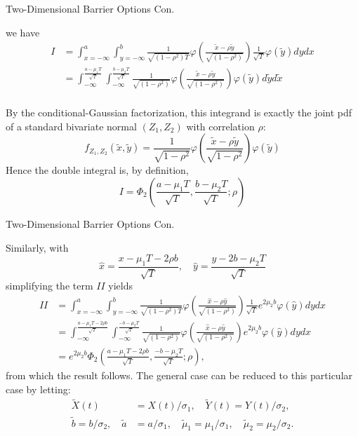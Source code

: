 \documentclass{beamer}
\begin{document}
\begin{frame}{Two-Dimensional Barrier Options Con.}

    {\footnotesize \footnotesize
    \par  we have
    \begin{align*}
    I &= \int_{x=-\infty}^a \int_{y=-\infty}^b \frac{1}{\sqrt{(1-\rho^2)T}} \varphi \left( \frac{\tilde{x}-\rho\tilde{y}}{\sqrt{(1-\rho^2)}} \right)
     \frac{1}{\sqrt{T}} \varphi (\tilde{y}) dy dx \\
    &= \int_{-\infty}^{\frac{a-\mu_1 T}{\sqrt{T}}} \int_{-\infty}^{\frac{b-\mu_2 T}{\sqrt{T}}} \frac{1}{\sqrt{(1-\rho^2)}} 
    \varphi \left( \frac{\tilde{x}-\rho\tilde{y}}{\sqrt{(1-\rho^2)}} \right) \varphi (\tilde{y}) d\tilde{y} d\tilde{x}\\
    \end{align*}
    \par By the conditional-Gaussian factorization, this integrand is exactly the joint pdf of a standard bivariate normal \((Z_1, Z_2)\) with correlation \(\rho\):
\[
f_{Z_1, Z_2} (\tilde{x}, \tilde{y}) = \frac{1}{\sqrt{1 - \rho^2}} \varphi \left( \frac{\tilde{x} - \rho \tilde{y}}{\sqrt{1 - \rho^2}} \right) \varphi (\tilde{y})
\]
Hence the double integral is, by definition,
\[
I = \Phi_2 \left( \frac{a - \mu_1 T}{\sqrt{T}}, \frac{b - \mu_2 T}{\sqrt{T}}; \rho \right)
\]
            }
        
\end{frame}

\begin{frame}{Two-Dimensional Barrier Options Con.}

    {\footnotesize \footnotesize
    \par Similarly, with
        \[
    \hat{x} = \frac{x - \mu_1 T - 2 \rho b}{\sqrt{T}}, \quad \hat{y} = \frac{y - 2b - \mu_2 T}{\sqrt{T}}
    \]
    simplifying the term \( II \) yields
    \begin{align*}
    II &= \int_{x=-\infty}^{a} \int_{y=-\infty}^{b} \frac{1}{\sqrt{(1 - \rho^2)T}} \varphi \left( \frac{\hat{x} - \rho \hat{y}}{\sqrt{(1 - \rho^2)}} \right) \frac{1}{\sqrt{T}} e^{2 \mu_2 b} \varphi (\hat{y}) dy dx \\
    &= \int_{-\infty}^{\frac{a - \mu_1 T - 2 \rho b}{\sqrt{T}}} \int_{-\infty}^{\frac{-b - \mu_2 T}{\sqrt{T}}} \frac{1}{\sqrt{(1 - \rho^2)}} \varphi \left( \frac{\hat{x} - \rho \hat{y}}{\sqrt{(1 - \rho^2)}} \right) e^{2 \mu_2 b} \varphi (\hat{y}) dy dx \\
    &= e^{2 \mu_2 b} \Phi_2 \left( \frac{a - \mu_1 T - 2 \rho b}{\sqrt{T}}, \frac{-b - \mu_2 T}{\sqrt{T}} ; \rho \right),
    \end{align*}
    from which the result follows. The general case can be reduced to this particular case by letting:
    \begin{align*}
        \tilde{X}(t) &= X(t)/\sigma_1, \quad \tilde{Y}(t) = Y(t)/\sigma_2,\\
        \tilde{b} = b/\sigma_2, \quad \tilde{a} &= a/\sigma_1, \quad \tilde{\mu}_1 = \mu_1/\sigma_1, \quad \tilde{\mu}_2 = \mu_2/\sigma_2.
    \end{align*}
    }
    
\end{frame}
\end{document}
